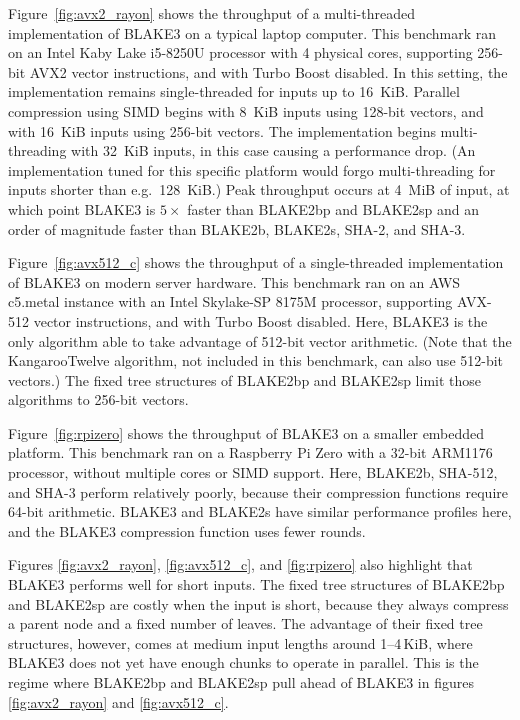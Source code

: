 \documentclass[11pt,notitlepage,a4paper]{article}
\begin{document}
Figure~\ref{fig:avx2_rayon} shows the throughput of a multi-threaded
implementation of BLAKE3 on a typical laptop computer. This benchmark ran on an
Intel Kaby Lake i5-8250U processor with 4 physical cores, supporting 256-bit
AVX2 vector instructions, and with Turbo Boost disabled. In this setting, the
implementation remains single-threaded for inputs up to 16~KiB. Parallel
compression using SIMD begins with 8~KiB inputs using 128-bit vectors, and with
16~KiB inputs using 256-bit vectors. The implementation begins multi-threading
with 32~KiB inputs, in this case causing a performance drop. (An implementation
tuned for this specific platform would forgo multi-threading for inputs shorter
than e.g.\ 128~KiB.) Peak throughput occurs at 4~MiB of input, at which point
BLAKE3 is $5\times$ faster than BLAKE2bp and BLAKE2sp and an order of magnitude
faster than BLAKE2b, BLAKE2s, SHA-2, and SHA-3.

Figure~\ref{fig:avx512_c} shows the throughput of a single-threaded
implementation of BLAKE3 on modern server hardware. This benchmark ran on an
AWS c5.metal instance with an Intel Skylake-SP 8175M processor, supporting
AVX-512 vector instructions, and with Turbo Boost disabled. Here, BLAKE3 is the
only algorithm able to take advantage of 512-bit vector arithmetic. (Note that
the KangarooTwelve algorithm, not included in this benchmark, can also use
512-bit vectors.) The fixed tree structures of BLAKE2bp and BLAKE2sp limit
those algorithms to 256-bit vectors.

Figure~\ref{fig:rpizero} shows the throughput of BLAKE3 on a smaller embedded
platform. This benchmark ran on a Raspberry Pi Zero with a 32-bit ARM1176
processor, without multiple cores or SIMD support. Here, BLAKE2b, SHA-512, and
SHA-3 perform relatively poorly, because their compression functions require
64-bit arithmetic. BLAKE3 and BLAKE2s have similar performance profiles here,
and the BLAKE3 compression function uses fewer rounds.

Figures \ref{fig:avx2_rayon}, \ref{fig:avx512_c}, and \ref{fig:rpizero} also
highlight that BLAKE3 performs well for short inputs. The fixed tree structures
of BLAKE2bp and BLAKE2sp are costly when the input is short, because they
always compress a parent node and a fixed number of leaves. The advantage of
their fixed tree structures, however, comes at medium input lengths around
1--4\,KiB, where BLAKE3 does not yet have enough chunks to operate in parallel.
This is the regime where BLAKE2bp and BLAKE2sp pull ahead of BLAKE3 in figures
\ref{fig:avx2_rayon} and \ref{fig:avx512_c}.
\end{document}
